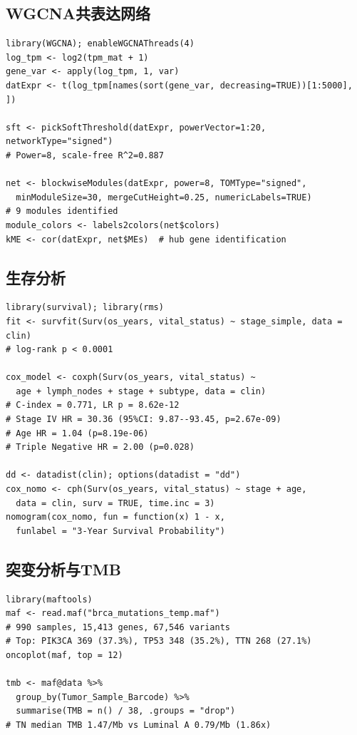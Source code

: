 \documentclass[12pt,a4paper]{ctexart}
\begin{document}
\subsection{WGCNA共表达网络}
\begin{lstlisting}[caption={WGCNA网络构建}, basicstyle=\ttfamily\scriptsize]
library(WGCNA); enableWGCNAThreads(4)
log_tpm <- log2(tpm_mat + 1)
gene_var <- apply(log_tpm, 1, var)
datExpr <- t(log_tpm[names(sort(gene_var, decreasing=TRUE))[1:5000], ])

sft <- pickSoftThreshold(datExpr, powerVector=1:20, networkType="signed")
# Power=8, scale-free R^2=0.887

net <- blockwiseModules(datExpr, power=8, TOMType="signed",
  minModuleSize=30, mergeCutHeight=0.25, numericLabels=TRUE)
# 9 modules identified
module_colors <- labels2colors(net$colors)
kME <- cor(datExpr, net$MEs)  # hub gene identification
\end{lstlisting}

\subsection{生存分析}
\begin{lstlisting}[caption={KM/Cox/Nomogram}, basicstyle=\ttfamily\scriptsize]
library(survival); library(rms)
fit <- survfit(Surv(os_years, vital_status) ~ stage_simple, data = clin)
# log-rank p < 0.0001

cox_model <- coxph(Surv(os_years, vital_status) ~
  age + lymph_nodes + stage + subtype, data = clin)
# C-index = 0.771, LR p = 8.62e-12
# Stage IV HR = 30.36 (95%CI: 9.87--93.45, p=2.67e-09)
# Age HR = 1.04 (p=8.19e-06)
# Triple Negative HR = 2.00 (p=0.028)

dd <- datadist(clin); options(datadist = "dd")
cox_nomo <- cph(Surv(os_years, vital_status) ~ stage + age,
  data = clin, surv = TRUE, time.inc = 3)
nomogram(cox_nomo, fun = function(x) 1 - x,
  funlabel = "3-Year Survival Probability")
\end{lstlisting}

\subsection{突变分析与TMB}
\begin{lstlisting}[caption={maftools突变分析与TMB}, basicstyle=\ttfamily\scriptsize]
library(maftools)
maf <- read.maf("brca_mutations_temp.maf")
# 990 samples, 15,413 genes, 67,546 variants
# Top: PIK3CA 369 (37.3%), TP53 348 (35.2%), TTN 268 (27.1%)
oncoplot(maf, top = 12)

tmb <- maf@data %>%
  group_by(Tumor_Sample_Barcode) %>%
  summarise(TMB = n() / 38, .groups = "drop")
# TN median TMB 1.47/Mb vs Luminal A 0.79/Mb (1.86x)
\end{lstlisting}
\end{document}
